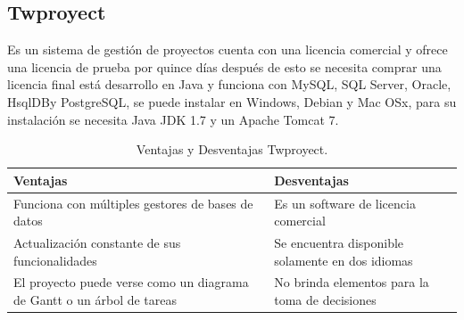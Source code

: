 \subsection{Twproyect}  
Es un sistema de gestión de proyectos cuenta con una licencia comercial y ofrece una licencia de prueba por quince días después de esto se necesita comprar una licencia final está desarrollo en Java y funciona con MySQL, SQL Server, Oracle, HsqlDBy PostgreSQL, se puede instalar en Windows, Debian y Mac OSx, para su instalación se necesita Java JDK 1.7 y un Apache Tomcat 7.\cite{R. Bicchierai}
\newline \newline
\begin{table}[htbp]
\begin{center}
\begin{tabular}{|p{85mm}|p{85mm}|}
\hline
Ventajas & Desventajas 
\\
\hline \hline
Funciona con múltiples gestores de bases de datos  & Es un software de licencia comercial 

\\ \hline
Actualización constante de sus funcionalidades  & Se encuentra disponible solamente en dos idiomas 
\\ \hline

El proyecto puede verse como un diagrama de Gantt o un árbol de tareas  & No brinda elementos para la toma de decisiones 

\\ \hline

\end{tabular}
\caption{Ventajas y Desventajas Twproyect.}
\label{tabla:ventajas}
\end{center}
\end{table}


